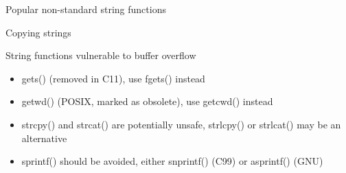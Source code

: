 \begin{frame}{Popular non-standard string functions}
    
\end{frame}
\begin{frame}{Copying strings}
    \only<1>{ Bad:  }
    \only<2>{ Bad:  }
\end{frame}
\begin{frame}{String functions vulnerable to buffer overflow}
    \begin{itemize}
        \item gets() (removed in C11), use fgets() instead
        \item getwd() (POSIX, marked as obsolete), use getcwd() instead
        \item strcpy() and strcat() are potentially unsafe, strlcpy() or strlcat() may be an alternative
        \item sprintf() should be avoided, either snprintf() (C99) or asprintf() (GNU)
    \end{itemize}
\end{frame}


